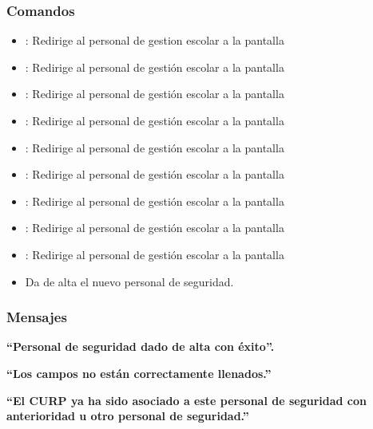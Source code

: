 \subsubsection{Comandos}
\begin{itemize}
	\item {}: Redirige al personal de gestion escolar a la pantalla 
	
	\item {}: Redirige al personal de gestión escolar a la pantalla 
	\item {}: Redirige al personal de gestión escolar a la pantalla 
	
	\item {}: Redirige al personal de gestión escolar a la pantalla 
	\item {}: Redirige al personal de gestión escolar a la pantalla 
	
	\item {}: Redirige al personal de gestión escolar a la pantalla 
	\item {}: Redirige al personal de gestión escolar a la pantalla 
	
	\item {}: Redirige al personal de gestión escolar a la pantalla 
	\item {}: Redirige al personal de gestión escolar a la pantalla     
	
    \item {} Da de alta el nuevo personal de seguridad.
    
\end{itemize}

\subsubsection{Mensajes}

\begin{Citemize}
    \item {\bf ``Personal de seguridad dado de alta con éxito''.}
    \item {\bf ``Los campos no están correctamente llenados.''}
    \item {\bf ``El CURP ya ha sido asociado a este personal de seguridad con anterioridad u otro personal de seguridad.''}
    
\end{Citemize}
